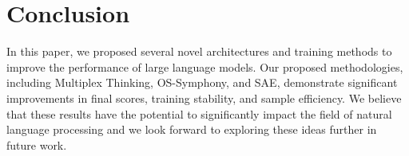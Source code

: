 \documentclass{article}
\begin{document}
\section{Conclusion}

In this paper, we proposed several novel architectures and training methods to improve the performance of large language models. Our proposed methodologies, including Multiplex Thinking, OS-Symphony, and SAE, demonstrate significant improvements in final scores, training stability, and sample efficiency. We believe that these results have the potential to significantly impact the field of natural language processing and we look forward to exploring these ideas further in future work.
\end{document}
